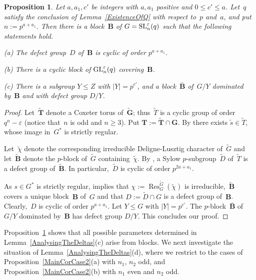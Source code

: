 \documentclass[12pt]{amsart}
\newcommand{\bG}{{\mathbf{G}}}      %
\newcommand{\bB}{{\mathbf{B}}}
\newcommand{\bT}{{\mathbf{T}}}
\def\GL{ \text{\rm GL} }
\def\SL{ \text{\rm SL} }
\DeclareMathOperator{\Res}{Res}               %
\newtheorem{prop}[thm]{Proposition}
\theoremstyle{theorem}
\theoremstyle{definition}
\theoremstyle{remark}
\begin{document}
\begin{prop}
\label{Existence1Prop}
Let $a, a_1, c'$ be integers with $a, a_1$ positive 
and $0 \leq c' \leq a$. Let~$q$ satisfy the conclusion of 
{\rm Lemma~\ref{ExistenceOfQ}} with respect to~$p$ and~$a$, and put 
$n := p^{a+a_1}$. Then there is a 
block~$\bB$ of $G = \SL^\varepsilon_n( q )$ such that the following 
statements hold.

{\rm (a)} The defect group~$D$ of~$\bB$ is cyclic of order $p^{a+a_1}$.

{\rm (b)} There is a cyclic block of $\GL^\varepsilon_n( q )$ 
covering~$\bB$.

{\rm (c)} There is a subgroup $Y \leq Z$ with $|Y| = p^{c'}$, and a 
block~$\bar{\bB}$ of~$G/Y$ dominated by~$\bB$ and with defect group $D/Y$.
\end{prop}
\begin{proof}
Let~$\tilde{\bT}$ denote a Coxeter torus of~$\tilde{\bG}$; thus~$\tilde{T}$ is a
cyclic group of order~$q^n - \varepsilon$ (notice that~$n$ is odd and 
$n \geq 3$). Put $\bT := \tilde{\bT} \cap \bG$. By 
\cite[Lemma~$3.6.3$]{HL25}
there
exists $\tilde{s} \in \tilde{T}$, whose image in~$G^*$ is strictly regular.

Let~$\tilde{\chi}$ denote the corresponding irreducible Deligne-Lusztig 
character of~$\tilde{G}$ and let~$\tilde{\bB}$ denote the $p$-block 
of~$\tilde{G}$ containing~$\tilde{\chi}$. By 
\cite[Lemma~$2.5.16$]{HL25},
a Sylow $p$-subgroup~$\tilde{D}$ 
of~$\tilde{T}$ is a defect group of~$\tilde{\bB}$. In particular,~$\tilde{D}$ 
is cyclic of order $p^{2a+a_1}$.

As $s \in G^*$ is strictly regular, \cite[Corollary~$2.5.17$]{HL25}
implies that $\chi := \Res^{\tilde{G}}_G( \tilde{\chi} )$ is
irreducible,~$\tilde{\bB}$ covers a unique block~$\bB$ of~$G$ and that 
$D := \tilde{D} \cap G$ is a defect group of~$\bB$. Clearly,~$D$ is cyclic of 
order $p^{a+a_1}$. Let $Y \leq G$ with $|Y| = p^{c'}$. The $p$-block~$\bar{\bB}$ 
of~$G/Y$ dominated by~$\bB$ has defect group $D/Y$. This concludes our proof.
\end{proof}

Proposition~\ref{Existence1Prop} shows that all possible parameters determined 
in Lemma~\ref{AnalysingTheDeltas}(c) arise from blocks.
We next investigate the situation of Lemma~\ref{AnalysingTheDeltas}(d), where 
we restrict to the cases of Proposition~\ref{MainCorCase2}(a) with $n_1$, $n_2$ 
odd, and Proposition~\ref{MainCorCase2}(b) with $n_1$ even and $n_2$ odd.
\end{document}
